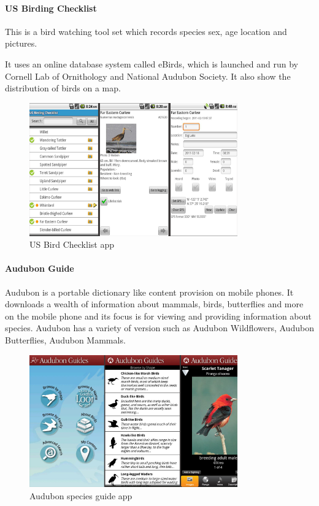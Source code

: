 \paragraph{US Birding Checklist}
This is a bird watching tool set which records species sex, age location and pictures\cite{similarproduct:usbird}.

It uses an online database system called eBirds\cite{similarproduct:ebird}, which is launched and run by Cornell Lab of Ornithology and National Audubon Society. It also show the distribution of birds on a map.

\begin{figure}[htb]
    \centering
    \includegraphics[width=0.8\textwidth]{introduction/project_description/usbirdingchecklist.png}
    \caption{US Bird Checklist app}
    \label{fig:usbirdapp}
\end{figure}

\paragraph{Audubon Guide}
Audubon is a portable dictionary like content provision on mobile phones. It downloads a wealth of information about mammals, birds, butterflies and more on the mobile phone and its focus is for viewing and providing information about species\cite{similarproduct:audubon}. Audubon has a variety of version such as Audubon Wildflowers, Audubon Butterflies, Audubon Mammals.

\begin{figure}[htb]
    \centering
    \includegraphics[width=0.8\textwidth]{introduction/project_description/audubonguide.png}
    \caption{Audubon species guide app}
    \label{fig:audubonapp}
\end{figure}
